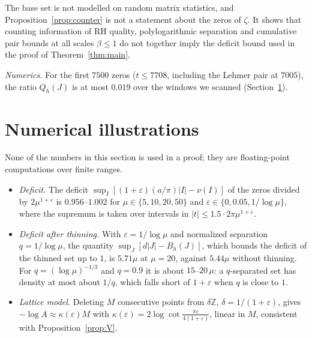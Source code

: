 \documentclass[11pt]{amsart}
\theoremstyle{definition}
\theoremstyle{remark}
\numberwithin{equation}{section}
\newcommand{\Z}{\mathbb{Z}}
\begin{document}
The base set is not modelled on random matrix statistics, and Proposition~\ref{prop:counter} is not a statement about the zeros of $\zeta$. It shows that counting information of RH quality, polylogarithmic separation and cumulative pair bounds at all scales $\beta\le1$ do not together imply the deficit bound used in the proof of Theorem~\ref{thm:main}.

\emph{Numerics.} For the first $7500$ zeros ($t\le7708$, including the Lehmer pair at $7005$), the ratio $Q_h(J)$ is at most $0.019$ over the windows we scanned (Section~\ref{sec:num}).

\section{Numerical illustrations}\label{sec:num}
None of the numbers in this section is used in a proof; they are floating-point computations over finite ranges.
\begin{itemize}
\item \emph{Deficit.} The deficit $\sup_I[(1+\varepsilon)(a/\pi)|I|-\nu(I)]$ of the zeros divided by $2\mu^{1+\varepsilon}$ is $0.956$--$1.002$ for $\mu\in\{5,10,20,50\}$ and $\varepsilon\in\{0,0.05,1/\log\mu\}$, where the supremum is taken over intervals in $|t|\le1.5\cdot2\pi\mu^{1+\varepsilon}$.
\item \emph{Deficit after thinning.} With $\varepsilon=1/\log\mu$ and normalized separation $q=1/\log\mu$, the quantity $\sup_J[d|J|-B_h(J)]$, which bounds the deficit of the thinned set up to $1$, is $5.71\mu$ at $\mu=20$, against $5.44\mu$ without thinning. For $q=(\log\mu)^{-1/3}$ and $q=0.9$ it is about $15$--$20\,\mu$: a $q$-separated set has density at most about $1/q$, which falls short of $1+\varepsilon$ when $q$ is close to $1$.
\item \emph{Lattice model.} Deleting $M$ consecutive points from $\delta\Z$, $\delta=1/(1+\varepsilon)$, gives $-\log A\approx\kappa(\varepsilon)M$ with $\kappa(\varepsilon)=2\log\cot\frac{\pi\varepsilon}{4(1+\varepsilon)}$, linear in $M$, consistent with Proposition~\ref{prop:V}.
\end{itemize}
\end{document}

